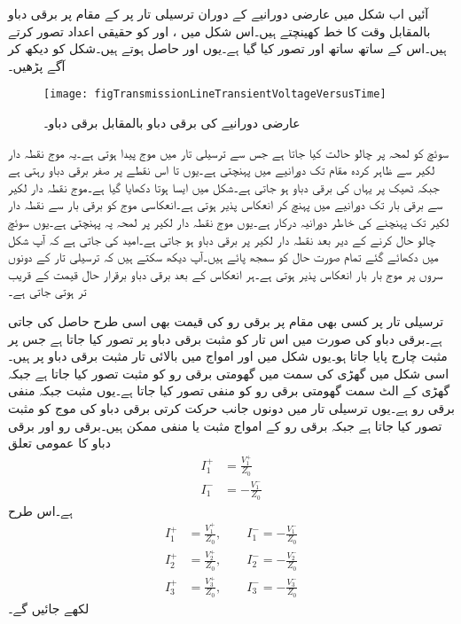 آئیں اب شکل  میں عارضی دورانیے  کے دوران ترسیلی تار پر  کے مقام پر  برقی دباو بالمقابل وقت کا خط کھینچتے ہیں۔اس شکل میں ،  اور  کو حقیقی اعداد تصور کرتے ہیں۔اس کے ساتھ ساتھ  اور  تصور کیا گیا ہے۔یوں  اور  حاصل ہوتے ہیں۔شکل  کو دیکھ کر آگے پڑھیں۔
\begin{figure}
\centering
\texttt{[image: figTransmissionLineTransientVoltageVersusTime]}
\caption{عارضی دورانیے کی برقی دباو بالمقابل برقی دباو۔}
\label{شکل_ترسیلی_عارضی_برقی_دباو_بالمقابل_وقت}
\end{figure}

 سوئچ کو لمحہ  پر چالو حالت کیا جاتا ہے جس سے ترسیلی تار میں  موج پیدا ہوتی ہے۔یہ موج نقطہ دار لکیر سے ظاہر کردہ مقام تک  دورانیے میں پہنچتی ہے۔یوں  تا  اس نقطے پر صفر برقی دباو رہتی ہے جبکہ ٹھیک  پر یہاں کی برقی دباو  ہو جاتی ہے۔شکل  میں ایسا ہوتا دکھایا گیا ہے۔موج  نقطہ دار لکیر سے برقی بار تک  دورانیے میں پہنچ کر انعکاس پذیر ہوتی ہے۔انعکاسی موج کو برقی بار سے نقطہ دار لکیر تک پہنچنے کی خاطر  دورانیہ درکار ہے۔یوں  موج نقطہ دار لکیر پر لمحہ  پہ پہنچتی ہے۔یوں سوئچ چالو حال کرنے کے  دیر بعد نقطہ دار لکیر پر برقی دباو  ہو جاتی ہے۔امید کی جاتی ہے کہ آپ شکل  میں دکھائے گئے تمام صورت حال کو سمجھ پائے ہیں۔آپ دیکھ سکتے ہیں کہ ترسیلی تار کے دونوں سروں پر موج بار بار انعکاس پذیر ہوتی ہے۔ہر انعکاس کے بعد برقی دباو برقرار حال قیمت کے قریب تر ہوتی جاتی ہے۔

ترسیلی تار پر کسی بھی مقام پر برقی رو کی قیمت بھی اسی طرح حاصل کی جاتی ہے۔برقی دباو کی صورت میں اس تار کو مثبت برقی دباو پر تصور کیا جاتا ہے جس پر مثبت چارج پایا جاتا ہو۔یوں شکل  میں  اور  امواج میں بالائی تار مثبت برقی دباو پر ہیں۔اسی شکل میں گھڑی کی سمت میں گھومتی برقی رو کو مثبت تصور کیا جاتا ہے جبکہ گھڑی کے الٹ سمت گھومتی برقی رو کو منفی تصور کیا جاتا ہے۔یوں  مثبت جبکہ  منفی برقی رو ہے۔یوں ترسیلی تار میں دونوں جانب حرکت کرتی برقی دباو کی موج کو مثبت تصور کیا جاتا ہے جبکہ برقی رو کے امواج مثبت یا منفی ممکن ہیں۔برقی رو اور برقی دباو کا عمومی تعلق
\begin{align*}
I_1^+&=\frac{V_1^+}{Z_0}\\
I_1^-&=-\frac{V_1^-}{Z_0}
\end{align*}
ہے۔اس طرح 
\begin{align*}
I_1^+&=\frac{V_1^+}{Z_0} , \quad \quad I_1^-=-\frac{V_1^-}{Z_0}\\
I_2^+&=\frac{V_2^+}{Z_0} , \quad \quad I_2^-=-\frac{V_2^-}{Z_0}\\
I_3^+&=\frac{V_3^+}{Z_0} , \quad \quad  I_3^-=-\frac{V_3^-}{Z_0}
\end{align*} 
لکھے جائیں گے۔


